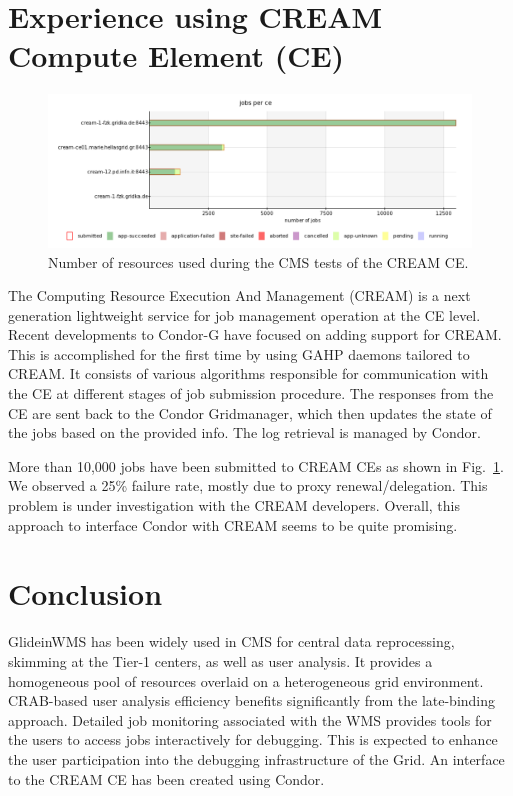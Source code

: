 \documentclass[a4paper]{jpconf}
\begin{document}
\section{Experience using CREAM Compute Element (CE)}
\begin{figure}
\begin{center}
\includegraphics[scale=0.45]{cms_cream}
\end{center}
\caption{Number of resources used during the CMS tests of the CREAM CE.}
\label{fig:cms_cream}
\end{figure}
The Computing Resource Execution And Management (CREAM) is a next generation lightweight service 
for job management operation at the CE level. Recent developments to Condor-G have focused on adding 
support for CREAM. This is accomplished for the first time by using GAHP daemons tailored to CREAM.
It consists of various algorithms responsible for communication with the CE at different stages of job submission
procedure. The responses from the CE are sent back to the Condor Gridmanager, which then updates 
the state of the jobs based on the provided info. The log retrieval is managed by Condor.

More than 10,000 jobs have been submitted to CREAM CEs as shown in Fig.~\ref{fig:cms_cream}. We observed a 25\% failure 
rate, mostly due to proxy renewal/delegation. This problem is under investigation with the CREAM developers. 
Overall, this approach to interface Condor with CREAM seems to be quite promising.
\section{Conclusion}
GlideinWMS has been widely used in CMS for central data reprocessing, skimming at the Tier-1 centers, as well
as user analysis. It provides a homogeneous pool of resources overlaid on a heterogeneous grid environment. 
CRAB-based user analysis efficiency benefits significantly from the late-binding approach. Detailed job monitoring 
associated with the WMS provides tools for the users to access 
jobs interactively for debugging. This is expected to enhance the user participation into the debugging 
infrastructure of the Grid. An interface to the CREAM CE has been created using Condor.  
\end{document}
